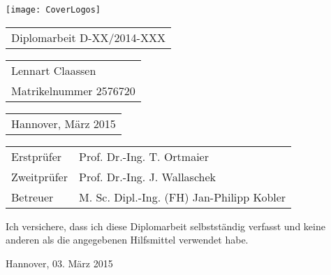 \begin{titlepage}
\begin{spacing}{2}

\begin{flushright} %
	\vspace*{-20mm}
	\texttt{[image: CoverLogos]}
\end{flushright} %

\vspace{38mm} {

\vfill


\vfill }
\end{spacing}
\begin{spacing}{1}
\begin{tabular}{l}
 \Large{Diplomarbeit D-XX/2014-XXX}
\end{tabular}

\vspace{5mm}

\begin{tabular}{l}
\large{Lennart Claassen}\\
\large{Matrikelnummer 2576720}
\end{tabular}

\vspace{5mm}

\begin{tabular}{l}
\large{Hannover, März 2015}
\end{tabular}


\vspace{5mm}
{\large
\begin{tabular}{l l}
Erstprüfer  & Prof. Dr.-Ing. T. Ortmaier\\
Zweitprüfer & Prof. Dr.-Ing. J. Wallaschek\\
Betreuer    & M. Sc. Dipl.-Ing. (FH) Jan-Philipp Kobler\\
\end{tabular}
}

\end{spacing}
\end{titlepage}




%
%
%


\noindent Ich versichere, dass ich diese Diplomarbeit selbstständig
verfasst und keine anderen als die angegebenen Hilfsmittel verwendet
habe.

\vspace{25mm}

\noindent Hannover, 03. März 2015
\newpage
